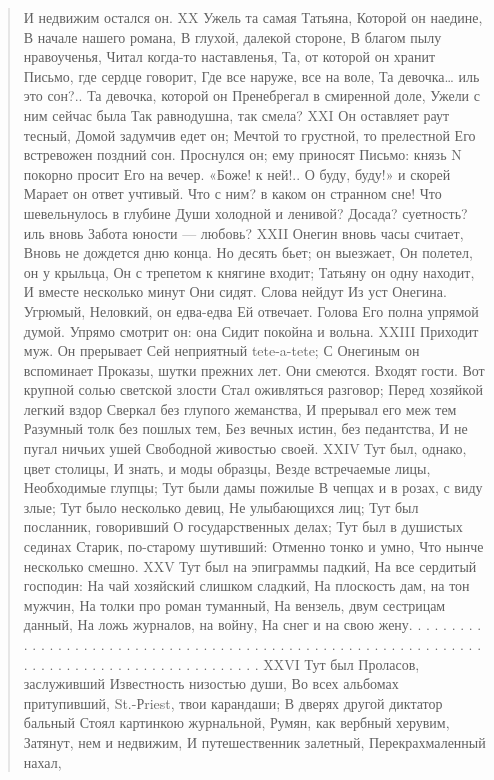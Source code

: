 \begin{verse}
И недвижим остался он.
XX
Ужель та самая Татьяна,
Которой он наедине,
В начале нашего романа,
В глухой, далекой стороне,
В благом пылу нравоученья,
Читал когда-то наставленья,
Та, от которой он хранит
Письмо, где сердце говорит,
Где все наруже, все на воле,
Та девочка… иль это сон?..
Та девочка, которой он
Пренебрегал в смиренной доле,
Ужели с ним сейчас была
Так равнодушна, так смела?
XXI
Он оставляет раут тесный,
Домой задумчив едет он;
Мечтой то грустной, то прелестной
Его встревожен поздний сон.
Проснулся он; ему приносят
Письмо: князь N покорно просит
Его на вечер. «Боже! к ней!..
О буду, буду!» и скорей
Марает он ответ учтивый.
Что с ним? в каком он странном сне!
Что шевельнулось в глубине
Души холодной и ленивой?
Досада? суетность? иль вновь
Забота юности — любовь?
XXII
Онегин вновь часы считает,
Вновь не дождется дню конца.
Но десять бьет; он выезжает,
Он полетел, он у крыльца,
Он с трепетом к княгине входит;
Татьяну он одну находит,
И вместе несколько минут
Они сидят. Слова нейдут
Из уст Онегина. Угрюмый,
Неловкий, он едва-едва
Ей отвечает. Голова
Его полна упрямой думой.
Упрямо смотрит он: она
Сидит покойна и вольна.
XXIII
Приходит муж. Он прерывает
Сей неприятный tete-a-tete;
С Онегиным он вспоминает
Проказы, шутки прежних лет.
Они смеются. Входят гости.
Вот крупной солью светской злости
Стал оживляться разговор;
Перед хозяйкой легкий вздор
Сверкал без глупого жеманства,
И прерывал его меж тем
Разумный толк без пошлых тем,
Без вечных истин, без педантства,
И не пугал ничьих ушей
Свободной живостью своей.
XXIV
Тут был, однако, цвет столицы,
И знать, и моды образцы,
Везде встречаемые лицы,
Необходимые глупцы;
Тут были дамы пожилые
В чепцах и в розах, с виду злые;
Тут было несколько девиц,
Не улыбающихся лиц;
Тут был посланник, говоривший
О государственных делах;
Тут был в душистых сединах
Старик, по-старому шутивший:
Отменно тонко и умно,
Что нынче несколько смешно.
XXV
Тут был на эпиграммы падкий,
На все сердитый господин:
На чай хозяйский слишком сладкий,
На плоскость дам, на тон мужчин,
На толки про роман туманный,
На вензель, двум сестрицам данный,
На ложь журналов, на войну,
На снег и на свою жену.
. . . . . . . . . . . . . . .
. . . . . . . . . . . . . . .
. . . . . . . . . . . . . . .
. . . . . . . . . . . . . . .
. . . . . . . . . . . . . . .
. . . . . . . . . . . . . . .
XXVI
Тут был Проласов, заслуживший
Известность низостью души,
Во всех альбомах притупивший,
St.-Рriest, твои карандаши;
В дверях другой диктатор бальный
Стоял картинкою журнальной,
Румян, как вербный херувим,
Затянут, нем и недвижим,
И путешественник залетный,
Перекрахмаленный нахал,

\end{verse}
